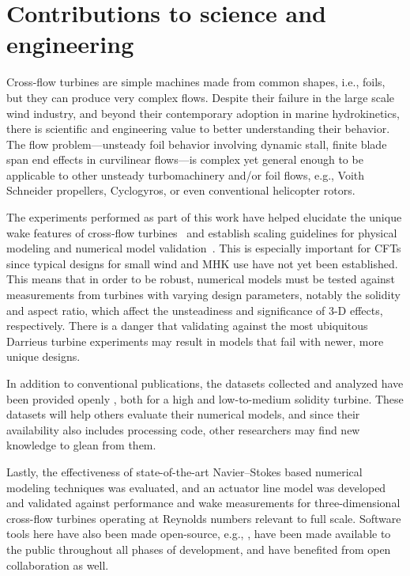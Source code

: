 \section{Contributions to science and engineering}

Cross-flow turbines are simple machines made from common shapes, i.e., foils,
but they can produce very complex flows. Despite their failure in the large
scale wind industry, and beyond their contemporary adoption in marine
hydrokinetics, there is scientific and engineering value to better understanding
their behavior. The flow problem---unsteady foil behavior involving dynamic
stall, finite blade span end effects in curvilinear flows---is complex yet
general enough to be applicable to other unsteady turbomachinery and/or foil
flows, e.g., Voith Schneider propellers, Cyclogyros, or even conventional
helicopter rotors.

The experiments performed as part of this work have helped elucidate the unique
wake features of cross-flow turbines~\cite{Bachant2015-JoT} and establish
scaling guidelines for physical modeling and numerical model
validation~\cite{Bachant2016-Energies}. This is especially important for CFTs
since typical designs for small wind and MHK use have not yet been established.
This means that in order to be robust, numerical models must be tested against
measurements from turbines with varying design parameters, notably the solidity
and aspect ratio, which affect the unsteadiness and significance of 3-D effects,
respectively. There is a danger that validating against the most ubiquitous
Darrieus turbine experiments may result in models that fail with newer, more
unique designs.

In addition to conventional publications, the datasets collected and analyzed
have been provided openly \cite{Bachant2014-RVAT-baseline,
    Bachant2016-RVAT-Re-dep, Bachant2016-RM2-data}, both for a high and
low-to-medium solidity turbine. These datasets will help others evaluate their
numerical models, and since their availability also includes processing code,
other researchers may find new knowledge to glean from them.

Lastly, the effectiveness of state-of-the-art Navier--Stokes based numerical
modeling techniques was evaluated, and an actuator line model was developed and
validated against performance and wake measurements for three-dimensional
cross-flow turbines operating at Reynolds numbers relevant to full scale.
Software tools here have also been made open-source, e.g.,
\cite{Bachant2016-turbinesFoam-v0.0.7}, have been made available to the public
throughout all phases of development, and have benefited from open collaboration
as well.

